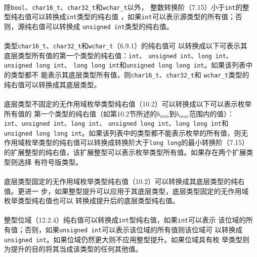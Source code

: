 \paragraph{}
除\texttt{bool}、\texttt{char16\_t}、\texttt{char32\_t}和\texttt{wchar\_t}以外，
整数转换阶（7.15）小于\texttt{int}的整型纯右值可以转换成\texttt{int}类型的纯右值
，如果\texttt{int}可以表示源类型的所有值；否则，源纯右值可以转换成
\texttt{unsigned int}类型的纯右值。

\paragraph{}
类型\texttt{char16\_t}、\texttt{char32\_t}和\texttt{wchar\_t}（6.9.1）的纯右值可
以转换成以下可表示其底层类型所有值的第一个类型的纯右值：\texttt{int}、
\texttt{unsigned int}、\texttt{long int}、\texttt{unsigned long int}、
\texttt{long long int}和\texttt{unsigned long long int}。如果该列表中的类型都不
能表示其底层类型所有值，则\texttt{char16\_t}、\texttt{char32\_t}和
\texttt{wchar\_t}类型的纯右值可以转换成其底层类型。

\paragraph{}
底层类型不固定的无作用域枚举类型纯右值（10.2）可以转换成以下可以表示枚举所有值的
第一个类型的纯右值（如第10.2节所述的$b_{min}$到$b_{max}$范围内的值）：
\texttt{int}、\texttt{unsigned int}、\texttt{long int}、
\texttt{unsigned long int}、\texttt{long long int}和
\texttt{unsigned long long int}。如果该列表中的类型都不能表示枚举的所有值，则无
作用域枚举类型的纯右值可以转换成转换阶大于\texttt{long long}的最小转换阶（7.15）
的扩展整型的纯右值，该扩展整型可以表示枚举类型所有值。如果存在两个扩展类型则选择
有符号版类型。

\paragraph{}
底层类型固定的无作用域枚举类型纯右值（10.2）可以转换成其底层类型的纯右值。更进一
步，如果整型提升可以应用于其底层类型，底层类型固定的无作用域枚举类型纯右值也可以
转换成提升后的底层类型纯右值。

\paragraph{}
整型位域（12.2.4）纯右值可以转换成\texttt{int}型纯右值，如果\texttt{int}可以表示
该位域的所有值；否则，如果\texttt{unsigned int}可以表示该位域的所有值则该位域可
以转换成\texttt{unsigned int}。如果位域仍然更大则不应用整型提升。如果位域具有枚
举类型则为提升的目的将其当成该类型的任何其他值。

